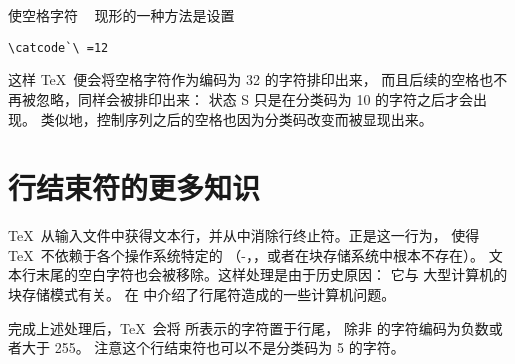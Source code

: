 \documentclass{book}
\begin{document}
使空格字符 \verb*- - 现形的一种方法是设置
\begin{verbatim}
\catcode`\ =12
\end{verbatim}
这样 \TeX\  便会将空格字符作为编码为 32 的字符排印出来，
而且后续的空格也不再被忽略，同样会被排印出来：
状态 {\italic S} 只是在分类码为 10 的字符之后才会出现。
类似地，控制序列之后的空格也因为分类码改变而被显现出来。

\section{行结束符的更多知识}

\TeX\ 从输入文件中获得文本行，并从中消除行终止符。正是这一行为，
使得 \TeX\ 不依赖于各个操作系统特定的%
（-，，或者在块存储系统中根本不存在）。
文本行末尾的空白字符也会被移除。这样处理是由于历史原因：
它与  大型计算机的块存储模式有关。
在 \cite{B:ctrl-M} 中介绍了行尾符造成的一些计算机问题。

完成上述处理后，\TeX\ 会将  所表示的字符置于行尾，
除非  的字符编码为负数或者大于 255。
注意这个行结束符也可以不是分类码为 5 的字符。
\end{document}
